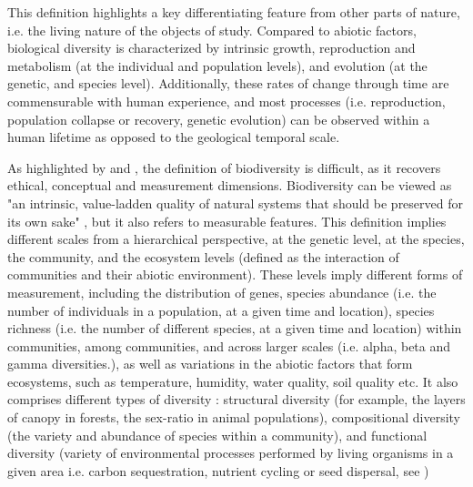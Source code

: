 This definition highlights a key differentiating feature from other parts of nature, i.e. the living nature of the objects of study. Compared to abiotic factors, biological diversity is characterized by intrinsic growth, reproduction and metabolism (at the individual and population levels), and evolution (at the genetic, and species level). Additionally, these rates of change through time are commensurable with human experience, and most processes (i.e. reproduction, population collapse or recovery, genetic evolution) can be observed within a human lifetime as opposed to the geological temporal scale. 

As highlighted by \cite{VanDyke2008} and \cite{mouysset_diversity_2023}, the definition of biodiversity is difficult, as it recovers ethical, conceptual and measurement dimensions. Biodiversity can be viewed as "an intrinsic, value-ladden quality of natural systems that should be preserved for its own sake" \citep{VanDyke2008, mouysset_diversity_2023}, but it also refers to measurable features.
This definition implies different scales from a hierarchical perspective, at the genetic level, at the species, the community, and the ecosystem levels (defined as the interaction of communities and their abiotic environment). These levels imply different forms of measurement, including the distribution of genes, species abundance (i.e. the number of individuals in a population, at a given time and location), species richness (i.e. the number of different species, at a given time and location) within communities, among communities, and across larger scales (i.e. alpha, beta and gamma diversities.), as well as variations in the abiotic factors that form ecosystems, such as temperature, humidity, water quality, soil quality etc. 
It also comprises different types of diversity : structural diversity (for example, the layers of canopy in forests, the sex-ratio in animal populations), compositional diversity (the variety and abundance of species within a community), and functional diversity (variety of environmental processes performed by living organisms in a given area i.e. carbon sequestration, nutrient cycling or seed dispersal, see \cite{loreau_biodiversity_2002})

